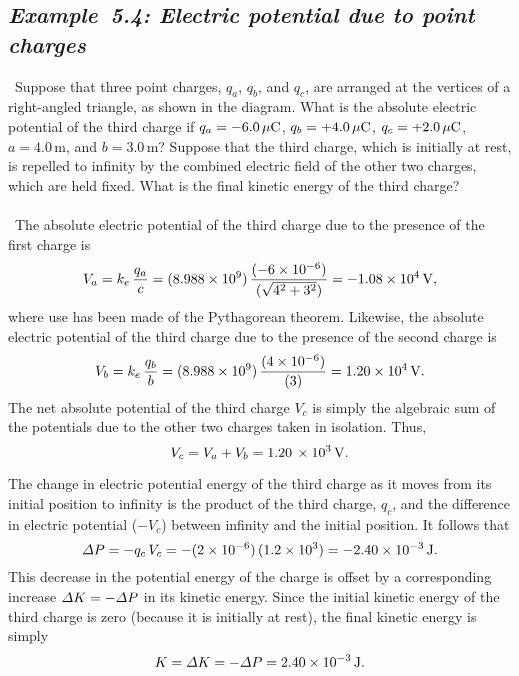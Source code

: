 \subsection*{\em Example~5.4: Electric potential due to point charges}
\begin{figure*}[h]
\epsfysize=2in
\centerline{}
\end{figure*}
~Suppose that three point charges, $q_a$, $q_b$, and $q_c$, are arranged at the
vertices of a right-angled triangle, as shown in the diagram. What is the absolute electric potential of the third charge if
$q_a=-6.0\,\mu{\rm C}$, $q_b=+4.0\,\mu{\rm C}$, $q_c = +2.0\,\mu{\rm C}$,
$a=4.0$\,m, and $b=3.0$\,m? Suppose that the third charge, which is initially
at rest,  is repelled to infinity by the
combined electric field of the other two charges, which are held fixed. What is the final  kinetic energy
of the third charge?\\
~\\
~The absolute electric potential of the third charge due to the presence of the
first charge is 
$$
V_a = k_e\,\frac{q_a}{c} = (8.988\times 10^9)\,\frac{(-6\times 10^{-6})}{(\sqrt{4^2+3^2})}= - 1.08 \times 10^4\,{\rm V},
$$
where use has been made of the Pythagorean theorem.
Likewise, the absolute electric potential of the third charge due to the presence of the second
charge is
$$
V_b = k_e\,\frac{q_b}{b} = (8.988\times 10^9)\,\frac{(4\times 10^{-6})}{(3)}=1.20\times 10^4\,{\rm V}.
$$
The net absolute potential of the third charge $V_c$ is simply the algebraic sum of the
potentials due to the other two charges taken in isolation. Thus,
$$
V_c = V_a + V_b =1.20\,\times 10^3\,{\rm V}.
$$

The change in electric potential energy of the third charge as it moves from its initial
position to infinity is the product of the third charge, $q_c$, and the difference in electric
potential ($-V_c$) between infinity and the initial position. It follows that
$$
{\mit\Delta}P = -q_c\,V_c = -(2\times 10^{-6})\,(1.2\times 10^3)=-2.40\times 10^{-3}\,{\rm J}.
$$
This decrease in the potential energy of the
charge is offset by a corresponding increase ${\mit\Delta}K= -{\mit\Delta}P$
in its kinetic energy. Since the initial kinetic energy of the third charge is zero (because it
is initially at rest), the final kinetic energy is simply
$$
K = {\mit\Delta}K = -{\mit\Delta}P = 2.40\times 10^{-3}\,{\rm J}.
$$
